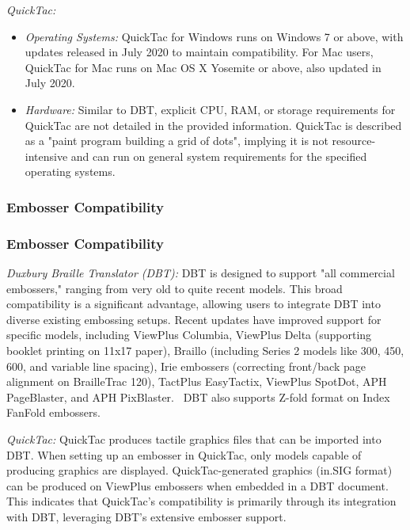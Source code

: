 \emph{QuickTac:}
\begin{itemize}
    \item \emph{Operating Systems:} QuickTac for Windows runs on Windows 7 or above, with updates released in July 2020 to maintain compatibility. \cite{DuxburyProducts} For Mac users, QuickTac for Mac runs on Mac OS X Yosemite or above, also updated in July 2020. \cite{DuxburyProducts}
    \item \emph{Hardware:} Similar to DBT, explicit CPU, RAM, or storage requirements for QuickTac are not detailed in the provided information. \cite{ElitaElPicsPrint,DuxburyProducts,ElitaManual} QuickTac is described as a "paint program building a grid of dots", implying it is not resource-intensive and can run on general system requirements for the specified operating systems.
\end{itemize}

\subsubsection{Embosser Compatibility}

\subsubsection{Embosser Compatibility}

\emph{Duxbury Braille Translator (DBT):}
DBT is designed to support "all commercial embossers," ranging from very old to quite recent models. \cite{PerkinsTouchMapper,IrieBrailleTrac,ElitaElPicsPrint,ViewplusTigerSuite} This broad compatibility is a significant advantage, allowing users to integrate DBT into diverse existing embossing setups. Recent updates have improved support for specific models, including ViewPlus Columbia, ViewPlus Delta (supporting booklet printing on 11x17 paper), Braillo (including Series 2 models like 300, 450, 600, and variable line spacing), Irie embossers (correcting front/back page alignment on BrailleTrac 120), TactPlus EasyTactix, ViewPlus SpotDot, APH PageBlaster, and APH PixBlaster.\ \cite{SoftorageInkscape} DBT also supports Z-fold format on Index FanFold embossers.\ \cite{SoftorageInkscape}

\emph{QuickTac:}
QuickTac produces tactile graphics files that can be imported into DBT. \cite{TouchMapper,ElitaElPicsPrint,ViewplusTSS,DuxburyDetails,SoftorageInkscape} When setting up an embosser in QuickTac, only models capable of producing graphics are displayed. \cite{DuxburyDetails} QuickTac-generated graphics (in.SIG format) can be produced on ViewPlus embossers when embedded in a DBT document. \cite{SoftorageInkscape} This indicates that QuickTac's compatibility is primarily through its integration with DBT, leveraging DBT's extensive embosser support.

